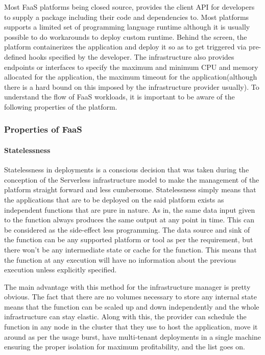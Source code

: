 \documentclass[12pt,titlepage]{article}
\begin{document}
Most FaaS platforms being closed source, provides the client API for developers
to supply a package including their code and dependencies to. Most platforms
supports a limited set of programming language runtime although it is usually
possible to do workarounds to deploy custom runtime. Behind the screen,
the platform containerizes the application and deploy it so as to get triggered
via pre-defined hooks specified by the developer. The infrastructure also provides endpoints or
interfaces to specify the maximum and minimum CPU and memory allocated for the
application, the maximum timeout for the application(although there is a
hard bound on this imposed by the infrastructure provider usually). To
understand the flow of FaaS workloads, it is important to be aware of the
following properties of the platform.

\subsubsection{Properties of FaaS}
\label{sec:org6a46703}
\paragraph{Statelessness}
\label{sec:org16a1b3c}
Statelessness in deployments is a conscious decision that was taken during the
conception of the Serverless infrastructure model to make the management of the
platform straight forward and less cumbersome. Statelessness simply means that
the applications that are to be deployed on the said platform exists as
independent functions that are pure in nature. As in, the same data input given
to the function always produces the same output at any point in time. This can
be considered as the side-effect less programming. The data source and sink of
the function can be any supported platform or tool as per the requirement, but
there won't be any intermediate state or cache for the function. This means that
the function at any execution will have no information about the previous
execution unless explicitly specified.

The main advantage with this method for the infrastructure manager is pretty
obvious. The fact that there are no volumes necessary to store any internal
state means that the function can be scaled up and down independently and the
whole infrastructure can stay elastic. Along with this, the provider can
schedule the function in any node in the cluster that they use to host the
application, move it around as per the usage burst, have multi-tenant
deployments in a single machine ensuring the proper isolation for maximum
profitability, and the list goes on.
\end{document}
